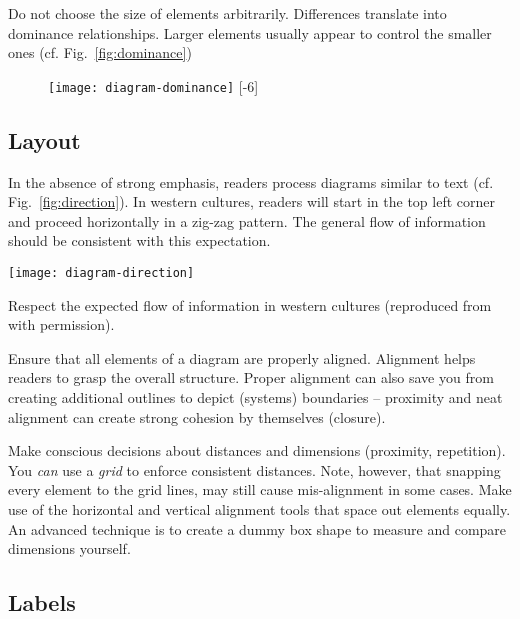 Do not choose the size of elements arbitrarily. Differences translate into dominance relationships. Larger elements usually appear to control the smaller ones (cf. Fig.~\ref{fig:dominance})

\begin{figure}[t]
\centering
\texttt{[image: diagram-dominance]}
[-6\baselineskip]
\end{figure}


\subsection{Layout}

In the absence of strong emphasis, readers process diagrams similar to text (cf. Fig.~\ref{fig:direction}). In western cultures, readers will start in the top left corner and proceed horizontally in a zig-zag pattern. The general flow of information should be consistent with this expectation.

\begin{marginfigure}
\centering
\texttt{[image: diagram-direction]}
\caption{\label{fig:direction} Respect the expected flow of information in western cultures (reproduced from \cite{Carter12} with permission).}%
\end{marginfigure}


Ensure that all elements of a diagram are properly aligned. Alignment helps readers to grasp the overall structure. Proper alignment can also save you from creating additional outlines to depict (systems) boundaries – proximity and neat alignment can create strong cohesion by themselves (closure).

Make conscious decisions about distances and dimensions (proximity, repetition). You \emph{can} use a \emph{grid} to enforce consistent distances. Note, however, that snapping every element to the grid lines, may still cause mis-alignment in some cases. Make use of the horizontal and vertical alignment tools that space out elements equally. An advanced technique is to create a dummy box shape to measure and compare dimensions yourself.

\subsection{Labels}

